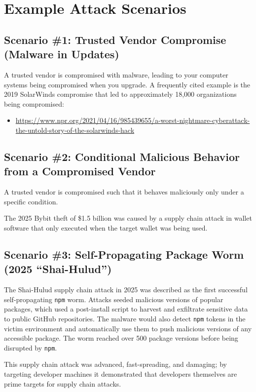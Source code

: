 \documentclass[11pt]{article}
\begin{document}
\section{Example Attack Scenarios}

\subsection{Scenario \#1: Trusted Vendor Compromise (Malware in Updates)}
A trusted vendor is compromised with malware, leading to your computer systems being compromised when you upgrade. A frequently cited example is the 2019 SolarWinds compromise that led to approximately 18{,}000 organizations being compromised:
\begin{itemize}
  \item \url{https://www.npr.org/2021/04/16/985439655/a-worst-nightmare-cyberattack-the-untold-story-of-the-solarwinds-hack}
\end{itemize}

\subsection{Scenario \#2: Conditional Malicious Behavior from a Compromised Vendor}
A trusted vendor is compromised such that it behaves maliciously only under a specific condition.

The 2025 Bybit theft of \$1.5 billion was caused by a supply chain attack in wallet software that only executed when the target wallet was being used.

\subsection{Scenario \#3: Self-Propagating Package Worm (2025 ``Shai-Hulud'')}
The Shai-Hulud supply chain attack in 2025 was described as the first successful self-propagating \texttt{npm} worm. Attacks seeded malicious versions of popular packages, which used a post-install script to harvest and exfiltrate sensitive data to public GitHub repositories. The malware would also detect \texttt{npm} tokens in the victim environment and automatically use them to push malicious versions of any accessible package. The worm reached over 500 package versions before being disrupted by \texttt{npm}.

This supply chain attack was advanced, fast-spreading, and damaging; by targeting developer machines it demonstrated that developers themselves are prime targets for supply chain attacks.
\end{document}
